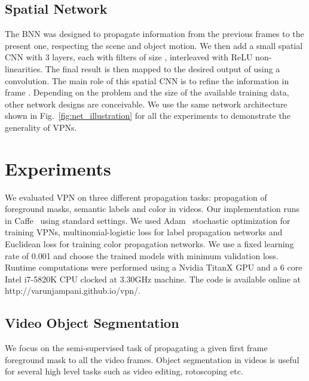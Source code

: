 \documentclass[10pt,twocolumn,letterpaper]{article}
\begin{document}
\vspace{-0.1cm}
\subsection{Spatial Network}\label{sec:spatialcnn}

The BNN was designed to propagate information from the previous frames to the present one,
respecting the scene and object motion.
We then add a small spatial CNN with 3 layers, each with  filters of size ,
interleaved with ReLU non-linearities.
The final result is then mapped to the desired output of  using a 
convolution.
The main role of this spatial CNN is to refine the information in frame .
Depending on the problem and the size of the available training data, other network designs are
conceivable. We use the same network architecture shown in Fig.~\ref{fig:net_illustration}
for all the experiments to demonstrate the generality of VPNs.

\vspace{-0.1cm}
\section{Experiments}
\label{sec:exps}

We evaluated VPN on three different propagation tasks: propagation of foreground masks, semantic
labels and color in videos. Our implementation runs in Caffe~\cite{jia2014caffe} using standard settings. We used Adam~\cite{kingma2014adam} stochastic optimization for training VPNs, multinomial-logistic loss for label propagation networks and Euclidean loss for training
color propagation networks. We use a fixed learning rate of 0.001 and choose the trained models
with minimum validation loss.
Runtime computations were performed using a
Nvidia TitanX GPU and a 6 core Intel i7-5820K CPU clocked at 3.30GHz machine.
The code is available online at http://varunjampani.github.io/vpn/.

\subsection{Video Object Segmentation}
\label{sec:videoseg}
We focus on the semi-supervised task of propagating
a given first frame foreground mask to all the video frames.
Object segmentation in videos is useful for several high level tasks such
as video editing, rotoscoping etc.

\vspace{-0.4cm}
\end{document}
